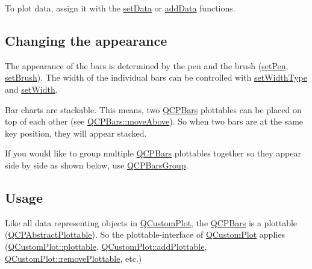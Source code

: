 To plot data, assign it with the \hyperlink{class_q_c_p_bars_aa3435aab19e0a49e4e7b41bd36a8d96b}{set\+Data} or \hyperlink{class_q_c_p_bars_a1f29cf08615040993209147fa68de3f2}{add\+Data} functions.\hypertarget{class_q_c_p_statistical_box_appearance}{}\subsection{Changing the appearance}\label{class_q_c_p_statistical_box_appearance}
The appearance of the bars is determined by the pen and the brush (\hyperlink{class_q_c_p_abstract_plottable_ab74b09ae4c0e7e13142fe4b5bf46cac7}{set\+Pen}, \hyperlink{class_q_c_p_abstract_plottable_a7a4b92144dca6453a1f0f210e27edc74}{set\+Brush}). The width of the individual bars can be controlled with \hyperlink{class_q_c_p_bars_adcaa3b41281bb2c0f7949b341592fcc0}{set\+Width\+Type} and \hyperlink{class_q_c_p_bars_afec6116579d44d5b706e0fa5e5332507}{set\+Width}.

Bar charts are stackable. This means, two \hyperlink{class_q_c_p_bars}{Q\+C\+P\+Bars} plottables can be placed on top of each other (see \hyperlink{class_q_c_p_bars_ac22e00a6a41509538c21b04f0a57318c}{Q\+C\+P\+Bars\+::move\+Above}). So when two bars are at the same key position, they will appear stacked.

If you would like to group multiple \hyperlink{class_q_c_p_bars}{Q\+C\+P\+Bars} plottables together so they appear side by side as shown below, use \hyperlink{class_q_c_p_bars_group}{Q\+C\+P\+Bars\+Group}.

\hypertarget{class_q_c_p_statistical_box_usage}{}\subsection{Usage}\label{class_q_c_p_statistical_box_usage}
Like all data representing objects in \hyperlink{class_q_custom_plot}{Q\+Custom\+Plot}, the \hyperlink{class_q_c_p_bars}{Q\+C\+P\+Bars} is a plottable (\hyperlink{class_q_c_p_abstract_plottable}{Q\+C\+P\+Abstract\+Plottable}). So the plottable-\/interface of \hyperlink{class_q_custom_plot}{Q\+Custom\+Plot} applies (\hyperlink{class_q_custom_plot_a32de81ff53e263e785b83b52ecd99d6f}{Q\+Custom\+Plot\+::plottable}, \hyperlink{class_q_custom_plot_ab7ad9174f701f9c6f64e378df77927a6}{Q\+Custom\+Plot\+::add\+Plottable}, \hyperlink{class_q_custom_plot_af3dafd56884208474f311d6226513ab2}{Q\+Custom\+Plot\+::remove\+Plottable}, etc.)

